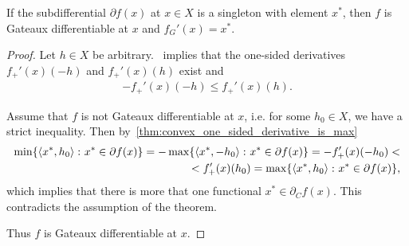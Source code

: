 \begin{theorem}
  \label{thm:singleton_subdifferential_implies_gateaux}
  If the subdifferential $\partial f(x)$ at $x \in X$ is a singleton with element $x^*$, then $f$ is Gateaux differentiable at $x$ and $f_G'(x) = x^*$.
\end{theorem}
\begin{proof}
  Let $h \in X$ be arbitrary.~ implies that the one-sided derivatives $f_+'(x)(-h)$ and $f_+'(x)(h)$ exist and
  \begin{align*}
    -f_+'(x)(-h) \leq f_+'(x)(h).
  \end{align*}

  Assume that $f$ is not Gateaux differentiable at $x$, i.e. for some $h_0 \in X$, we have a strict inequality. Then by~\cref{thm:convex_one_sided_derivative_is_max}
  \begin{align*}
    \min\{ \left\langle x^*, h_0 \right\rangle \colon x^* \in \partial f(x) \}
    =
    -\max\{ \left\langle x^*, -h_0 \right\rangle \colon x^* \in \partial f(x) \}
    =
    -f_+'(x)(-h_0)
    < \\ <
    f_+'(x)(h_0)
    =
    \max\{ \left\langle x^*, h_0 \right\rangle \colon x^* \in \partial f(x) \},
  \end{align*}
  which implies that there is more that one functional $x^* \in \partial_C f(x)$. This contradicts the assumption of the theorem.

  Thus $f$ is Gateaux differentiable at $x$.
\end{proof}
